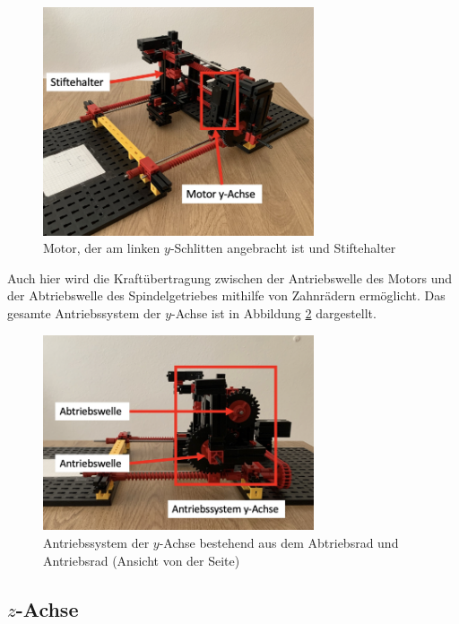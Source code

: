 \documentclass[conference,compsoc,final,a4paper]{IEEEtran}
\begin{document}
\begin{figure}[h]
\centering
\includegraphics[width=8cm]{../images/yAchse1.png}
\caption{Motor, der am linken $y$-Schlitten angebracht ist und Stiftehalter}
\label{fig:AufbauyAchse1}
\end{figure}

Auch hier wird die Kraftübertragung zwischen der Antriebswelle des Motors und der Abtriebswelle des
Spindelgetriebes mithilfe von Zahnrädern ermöglicht. Das gesamte Antriebssystem der $y$-Achse ist in Abbildung \ref{fig:AufbauyAchse2} dargestellt.

\begin{figure}[h]
\centering
\includegraphics[width=8cm]{../images/yAchse2.png}
\caption{Antriebssystem der $y$-Achse bestehend aus dem Abtriebsrad und Antriebsrad (Ansicht von der Seite)}
\label{fig:AufbauyAchse2}
\end{figure}

\subsection{$z$-Achse}
\end{document}
